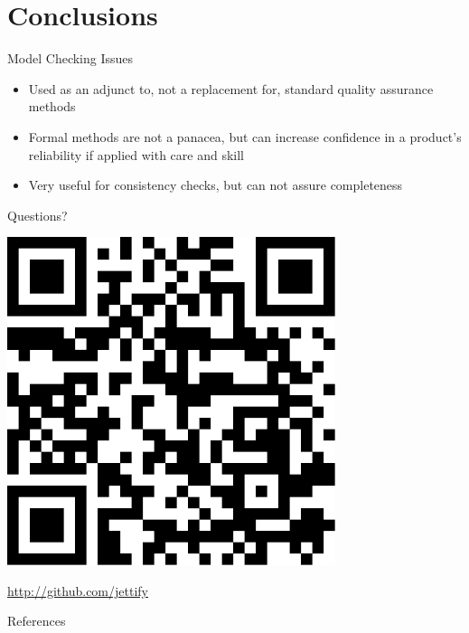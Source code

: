 \documentclass[12pt]{beamer}
\begin{document}
  \section{Conclusions}
  \begin{frame}{Model Checking Issues}
    \begin{itemize}
      \item Used as an adjunct to, not a replacement for, standard quality
          assurance methods
      \item Formal methods are not a panacea, but can increase confidence in
          a product’s reliability if applied with care and skill
      \item Very useful for consistency checks, but can not assure
          completeness
    \end{itemize}
  \end{frame}
\begin{frame}
    \vspace{1cm}
    \begin{center}{\Huge Questions?} \end{center}
    \begin{center} \includegraphics[scale=0.7]{figures/qrcode}\end{center}
    \begin{center}
        \href{http://github.com/jettify}{http://github.com/jettify}
    \end{center}
\end{frame}
\appendix
\begin{frame}[allowframebreaks]{References}
    
    
\end{frame}
\end{document}
